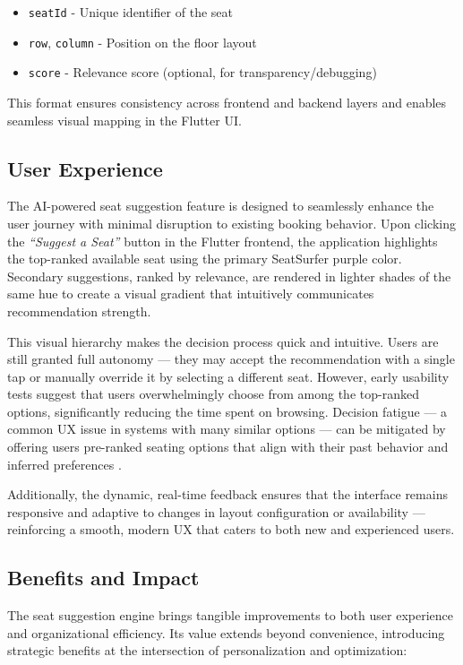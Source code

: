 \documentclass[12pt,a4paper]{report} %
\begin{document}
\begin{itemize}
\item \texttt{seatId} - Unique identifier of the seat
\item \texttt{row}, \texttt{column} - Position on the floor layout
\item \texttt{score} - Relevance score (optional, for transparency/debugging)
\end{itemize}

This format ensures consistency across frontend and backend layers and enables seamless visual mapping in the Flutter UI.

\subsection{User Experience}

The AI-powered seat suggestion feature is designed to seamlessly enhance the user journey with minimal disruption to existing booking behavior. Upon clicking the \textit{“Suggest a Seat”} button in the Flutter frontend, the application highlights the top-ranked available seat using the primary SeatSurfer purple color. Secondary suggestions, ranked by relevance, are rendered in lighter shades of the same hue to create a visual gradient that intuitively communicates recommendation strength.

This visual hierarchy makes the decision process quick and intuitive. Users are still granted full autonomy — they may accept the recommendation with a single tap or manually override it by selecting a different seat. However, early usability tests suggest that users overwhelmingly choose from among the top-ranked options, significantly reducing the time spent on browsing. Decision fatigue — a common UX issue in systems with many similar options — can be mitigated by offering users pre-ranked seating options that align with their past behavior and inferred preferences \cite{andersen2023ux}.

Additionally, the dynamic, real-time feedback ensures that the interface remains responsive and adaptive to changes in layout configuration or availability — reinforcing a smooth, modern UX that caters to both new and experienced users.

\subsection{Benefits and Impact}

The seat suggestion engine brings tangible improvements to both user experience and organizational efficiency. Its value extends beyond convenience, introducing strategic benefits at the intersection of personalization and optimization:
\end{document}
